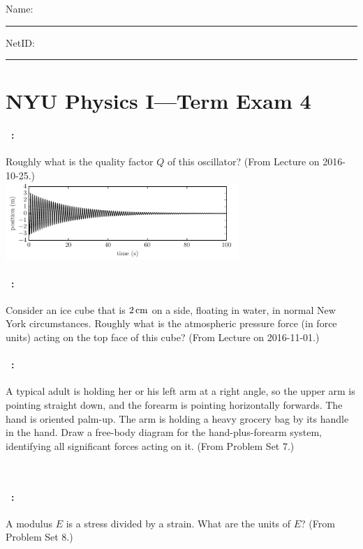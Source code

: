 \documentclass[12pt]{article} 
\begin{document}
\noindent
Name: \rule[-1ex]{0.55\textwidth}{0.1pt}
NetID: \rule[-1ex]{0.2\textwidth}{0.1pt}

\section*{NYU Physics I---Term Exam 4}

\paragraph{\problemname~\theproblem:}%
Roughly what is the quality factor $Q$ of this oscillator? (From
Lecture on 2016-10-25.) \\
\includegraphics[width=0.66\textwidth]{../py/damped_oscillation.pdf}

\vfill

\paragraph{\problemname~\theproblem:}%
Consider an ice cube that is $2\,\mathrm{cm}$ on a side, floating in water, in
normal New York circumstances. Roughly what is the atmospheric
pressure force (in force units) acting on the top face of this cube?
(From Lecture on 2016-11-01.)

\vfill

\paragraph{\problemname~\theproblem:}%
A typical adult is holding her or his left arm at a right angle, so
the upper arm is pointing straight down, and the forearm is pointing
horizontally forwards.  The hand is oriented palm-up.  The arm is
holding a heavy grocery bag by its handle in the hand.  Draw a
free-body diagram for the hand-plus-forearm system, identifying all
significant forces acting on it. (From Problem Set 7.)

\vfill
~
\clearpage

\paragraph{\problemname~\theproblem:}%
A modulus $E$ is a stress divided by a strain. What are the units of $E$?
(From Problem Set 8.)
\end{document}
